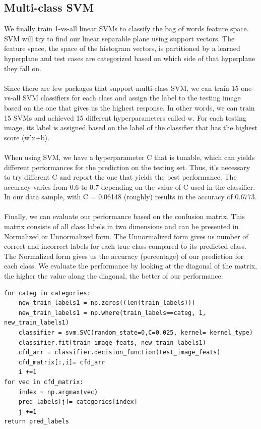 \subsection*{Multi-class SVM}
\vspace{-5pt}
We finally train 1-vs-all linear SVMs to classify the bag of words feature space. SVM will try to find our linear separable plane using support vectors.  The feature space, the space of the histogram vectors, is partitioned by a learned hyperplane and test cases are categorized based on which side of that hyperplane they fall on.\\\\ Since there are few packages that support multi-class SVM, we can train 15 one-vs-all SVM classifiers for each class and assign the label to the testing image based on the one that gives us the highest response. In other words, we can train 15 SVMs and achieved 15 different hyperparameters called w. For each testing image, its label is assigned based on the label of the classifier that has the highest score (w'x+b).\\ \\When using SVM, we have a hyperparameter C that is tunable, which can yields different performances for the prediction on the testing set. Thus, it's necessary to try different C and report the one that yields the best performance. The accuracy varies from 0.6 to 0.7 depending on the value of C used in the classifier. In our data sample, with C = 0.06148 (roughly) results in the accuracy of 0.6773.\\ \\
Finally, we can evaluate our performance based on the confusion matrix. This matrix consists of all class labels in two dimensions and can be presented in Normalized or Unnormalized form. The Unnormalized form gives us number of correct and incorrect labels for each true class compared to its predicted class. The Normalized form gives us the accuracy (percentage) of our prediction for each class. We evaluate the performance by looking at the diagonal of the matrix, the higher the value along the diagonal, the better of our performance.


\begin{lstlisting}[style=Matlab-editor]
for categ in categories:
    new_train_labels1 = np.zeros((len(train_labels)))
    new_train_labels1 = np.where(train_labels==categ, 1, new_train_labels1)
    classifier = svm.SVC(random_state=0,C=0.025, kernel= kernel_type)
    classifier.fit(train_image_feats, new_train_labels1)
    cfd_arr = classifier.decision_function(test_image_feats)
    cfd_matrix[:,i]= cfd_arr
    i +=1
for vec in cfd_matrix:
    index = np.argmax(vec)
    pred_labels[j]= categories[index]
    j +=1
return pred_labels
\end{lstlisting}
\vspace{-15pt}

